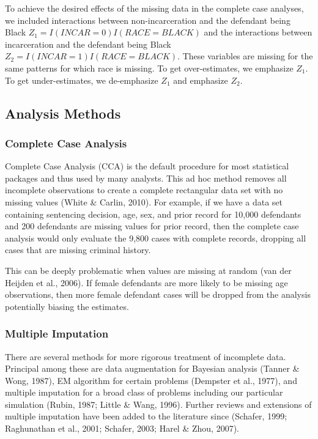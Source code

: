 \documentclass[titlepage]{article}
\begin{document}
To achieve the desired effects of the missing data in the complete case analyses, we included interactions between non-incarceration and the defendant being Black \(Z_1 = I(INCAR = 0)I(RACE = BLACK)\) and the interactions between incarceration and the defendant being Black \(Z_{2} = I(INCAR = 1)I(RACE = BLACK)\). These variables are missing for the same patterns for which race is missing. To get over-estimates, we emphasize \(Z_1\). To get under-estimates, we de-emphasize \(Z_1\) and emphasize \(Z_2\).

\subsection{Analysis Methods}

\subsubsection{Complete Case Analysis}

Complete Case Analysis (CCA) is the default procedure for most statistical packages and thus used by many analysts. This ad hoc method removes all incomplete observations to create a complete rectangular data set with no missing values (White \& Carlin, 2010). For example, if we have a data set containing sentencing decision, age, sex, and prior record for 10,000 defendants and 200 defendants are missing values for prior record, then the complete case analysis would only evaluate the 9,800 cases with complete records, dropping all cases that are missing criminal history.

This can be deeply problematic when values are missing at random (van der Heijden et al., 2006). If female defendants are more likely to be missing age observations, then more female defendant cases will be dropped from the analysis potentially biasing the estimates.

\subsubsection{Multiple Imputation}

There are several methods for more rigorous treatment of incomplete data. Principal among these are data augmentation for Bayesian analysis (Tanner \& Wong, 1987), EM algorithm for certain problems (Dempster et al., 1977), and multiple imputation for a broad class of problems including our particular simulation (Rubin, 1987; Little \& Wang, 1996). Further reviews and extensions of multiple imputation have been added to the literature since (Schafer, 1999; Raghunathan et al., 2001; Schafer, 2003; Harel \& Zhou, 2007).
\end{document}
